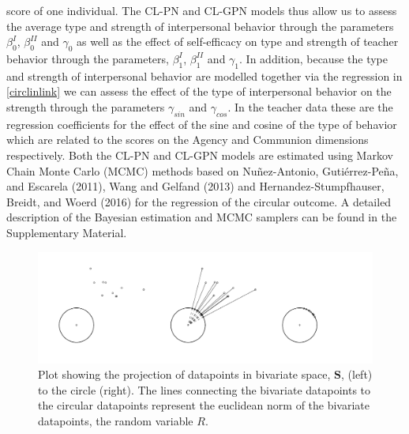 \documentclass[man]{apa6}
\begin{document}
score of one individual. The CL-PN and CL-GPN models thus allow us to assess the
average type and strength of interpersonal behavior through the parameters
\(\beta_{0}^{I}\), \(\beta_{0}^{II}\) and \(\gamma_0\) as well as the effect of
self-efficacy on type and strength of teacher behavior through the parameters,
\(\beta_{1}^{I}\), \(\beta_{1}^{II}\) and \(\gamma_1\). In addition, because the type
and strength of interpersonal behavior are modelled together via the regression
in \eqref{circlinlink} we can assess the effect of the type of interpersonal
behavior on the strength through the parameters \(\gamma_{sin}\) and
\(\gamma_{cos}\). In the teacher data these are the regression coefficients for
the effect of the sine and cosine of the type of behavior which are related to
the scores on the Agency and Communion dimensions respectively.\newline
\indent Both the CL-PN and CL-GPN models are estimated using Markov Chain Monte
Carlo (MCMC) methods based on Nuñez-Antonio, Gutiérrez-Peña, and Escarela (2011), Wang and Gelfand (2013) and
Hernandez-Stumpfhauser, Breidt, and Woerd (2016) for the regression of the circular outcome. A detailed
description of the Bayesian estimation and MCMC samplers can be found in the
Supplementary Material.

\begin{figure}
\centering
\includegraphics[width = \textwidth]{Plots/plotprojecting.pdf}
\caption{Plot showing the projection of datapoints in bivariate space, $\boldsymbol{S}$, (left) to the circle (right). The lines connecting the bivariate datapoints to the circular datapoints represent the euclidean norm of the bivariate datapoints, the random variable $R$.}
\label{projection}
\end{figure}
\end{document}
